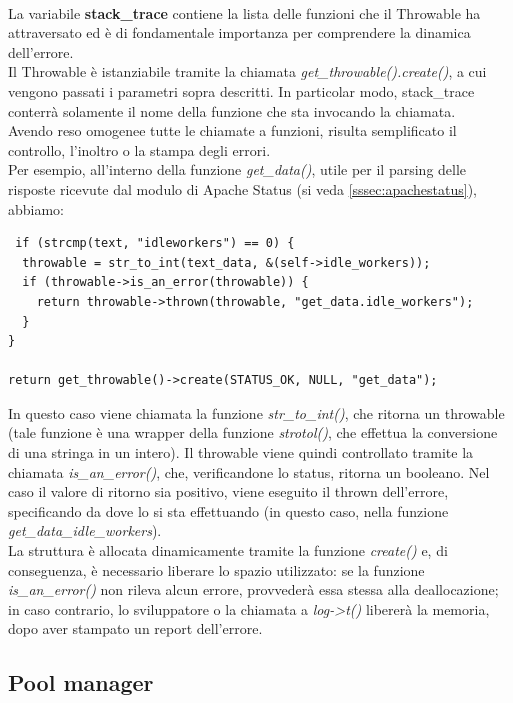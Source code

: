\documentclass[italian]{tktltiki2}
\begin{document}
\\
La variabile \textbf{stack\_trace} contiene la lista delle funzioni che il Throwable ha attraversato ed è di fondamentale importanza per comprendere la dinamica dell'errore.
\\
Il Throwable è istanziabile tramite la chiamata \emph{get\_throwable().create()}, a cui vengono passati i parametri sopra descritti. In particolar modo, stack\_trace conterrà solamente il nome della funzione che sta invocando la chiamata.
\\
Avendo reso omogenee tutte le chiamate a funzioni, risulta semplificato il controllo, l'inoltro o la stampa degli errori.
\\
Per esempio, all'interno della funzione \emph{get\_data()}, utile per il parsing delle risposte ricevute dal modulo di Apache Status (si veda \ref{sssec:apachestatus}), abbiamo:

\begin{lstlisting}
 if (strcmp(text, "idleworkers") == 0) {
  throwable = str_to_int(text_data, &(self->idle_workers));
  if (throwable->is_an_error(throwable)) {
    return throwable->thrown(throwable, "get_data.idle_workers");
  }
}

return get_throwable()->create(STATUS_OK, NULL, "get_data");
\end{lstlisting}
In questo caso viene chiamata la funzione \emph{str\_to\_int()}, che ritorna un throwable (tale funzione è una wrapper della funzione \emph{strotol()}, che effettua la conversione di una stringa in un intero). Il throwable viene quindi controllato tramite la chiamata \emph{is\_an\_error()}, che, verificandone lo status, ritorna un booleano. Nel caso il valore di ritorno sia positivo, viene eseguito il thrown dell'errore, specificando da dove lo si sta effettuando (in questo caso, nella funzione \emph{get\_data\_idle\_workers}).
\\
La struttura è allocata dinamicamente tramite la funzione \emph{create()} e, di conseguenza, è necessario liberare lo spazio utilizzato: se la funzione \emph{is\_an\_error()} non rileva alcun errore, provvederà essa stessa alla deallocazione; in caso contrario, lo sviluppatore o la chiamata a \emph{log->t()} libererà la memoria, dopo aver stampato un report dell'errore.

\subsection{Pool manager}
\label{ssec:pool}
\end{document}
